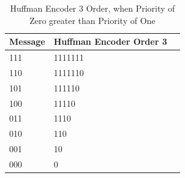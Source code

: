 \begin{refsection}
\begin{table}[H]
\centering
\caption{Huffman Encoder 3 Order, when Priority of Zero greater than Priority of One}
\label{tb:hufmmanencoder5}
\begin{tabular}{|l|l|l|}
\hline
\textbf{Message}                      & \textbf{Huffman Encoder Order 3}                                       \\ \hline
111                 & 1111111                                                          \\ \hline
110                 & 1111110                                                          \\ \hline
101                 & 111110                                                         \\ \hline
100                 & 11110                                                   \\ \hline
011                 & 1110                                                          \\ \hline
010                 & 110                                                          \\ \hline
001                 & 10                                                         \\ \hline
000                 & 0                                                         \\ \hline
\end{tabular}
\end{table}




\end{refsection}
